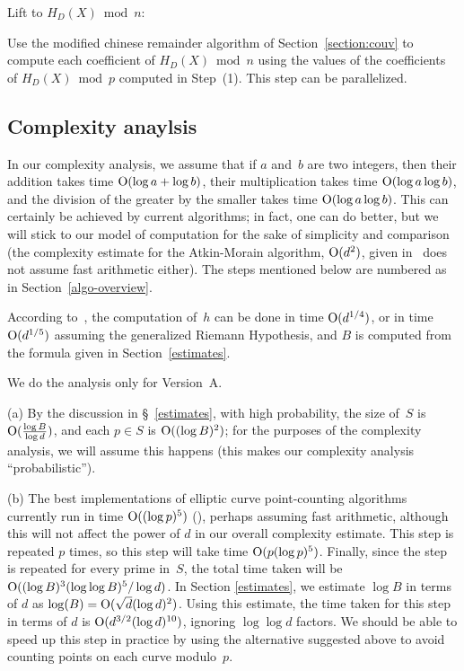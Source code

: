 \documentclass{amsart}
\newcommand{\noi}{\noindent}
\newcommand{\bigo}{{\rm O}}
\theoremstyle{plain}
\begin{document}
\vspace{0.1in}
\noi {\bf Step~(2)} Lift to $H_D(X) \bmod n$: 

\vspace{0.1in}
\noi Use the modified chinese remainder algorithm of Section~\ref{section:couv} to compute
each coefficient of $H_D (X) \bmod n$ using the values of the coefficients of
$H_D(X) \bmod p$ computed in Step~(1).  This step can be parallelized.


\subsection{Complexity anaylsis} \label{complexity-analysis}

In our complexity analysis, we assume that if $a$ and~$b$ are two integers,
then their addition takes time $\bigo(\log a + \log b)$, their
multiplication takes time $\bigo(\log a \log b)$, and the division
of the greater by the smaller takes time $\bigo(\log a \log b)$.
This can certainly be achieved by current algorithms; in fact,
one can do better, but we will stick to our model of computation
for the sake of simplicity and comparison (the complexity estimate for the 
Atkin-Morain algorithm, $\bigo(d^2)$, 
given in~\cite{ll} does not assume fast arithmetic either). 
The steps mentioned below are numbered as in Section~\ref{algo-overview}.

\vspace{0.1in}

\noi {\bf Step~(0)} 
 According to~\cite[\S5.4]{cohen}, the computation of~$h$
can be done in time $\bigo(d^{1/4})$, or in time $\bigo(d^{1/5})$ 
assuming the generalized Riemann Hypothesis, and $B$ is computed from the formula
given in Section~\ref{estimates}.

\vspace{0.1in}

\noi {\bf Step~(1)} We do the analysis only for Version~A.

\noi (a)
By the discussion in \S~\ref{estimates},
with high probability, 
the size of~$S$ is $\bigo(\frac{\log B}{\log d})$, and
each $p \in S$ is $\bigo((\log B)^2)$; for the purposes
of the complexity analysis, we will assume this happens
(this makes our complexity analysis ``probabilistic'').

\noi (b) 
The best implementations of elliptic curve point-counting algorithms 
currently run in time $\bigo ((\log p)^5)$ (\cite{schoof}), perhaps assuming
fast arithmetic, although this will not affect the power of $d$ in our overall
complexity estimate.  This step is repeated $p$ 
times, so this step will take time $\bigo (p(\log p)^5)$.
Finally, since the step is repeated for every prime in~$S$,
the total time taken will be $\bigo((\log B)^3 (\log \log B)^5/\log d )$.
In Section \ref{estimates}, we estimate $\log B$ in terms of $d$ as
$ \log(B) = \bigo (\sqrt{d} (\log d)^2)$.  Using this estimate,
the time taken for this step in terms of $d$ is
$\bigo(d^{3/2} (\log d)^{10})$, ignoring $\log \log d$ factors.
We should be able to speed up this step in practice by using the alternative
suggested above to avoid counting points on each curve modulo~$p$.
\end{document}
